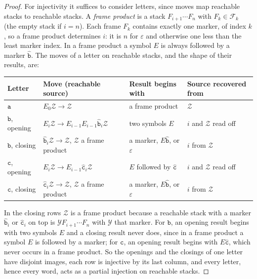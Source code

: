 \documentclass[11pt]{article}
\numberwithin{equation}{section}
\theoremstyle{plain}
\theoremstyle{definition}
\theoremstyle{remark}
\newcommand{\eps}{\varepsilon}
\theoremstyle{plain}
\begin{document}
\begin{proof}
For injectivity it suffices to consider letters, since moves map reachable
stacks to reachable stacks.  A \emph{frame product} is a stack
$F_{i+1}\cdots F_n$ with $F_k\in\mathcal F_k$ (the empty stack if $i=n$).  Each
frame $F_k$ contains exactly one marker, of index $k$, so a frame product
determines $i$: it is $n$ for $\eps$ and otherwise one less than the least
marker index.  In a frame product a symbol $E$ is always followed by a marker
$\hat{\mathtt b}$.  The moves of a letter on reachable stacks, and the shape of
their results, are:
\begin{center}
\footnotesize
\renewcommand{\arraystretch}{1.15}
\begin{tabular}{@{}llll@{}}
\hline
Letter & Move (reachable source) & Result begins with & Source recovered from\\
\hline
$\mathtt a$ & $E_0\mathcal Z\to\mathcal Z$ & a frame product & $\mathcal Z$\\
$\mathtt b$, opening & $E_i\mathcal Z\to E_{i-1}E_{i-1}\hat{\mathtt b}_i\mathcal Z$ & two symbols $E$ & $i$ and $\mathcal Z$ read off\\
$\mathtt b$, closing & $\hat{\mathtt b}_i\mathcal Z\to\mathcal Z$, $\mathcal Z$ a frame product & a marker, $E\hat{\mathtt b}$, or $\eps$ & $i$ from $\mathcal Z$\\
$\mathtt c$, opening & $E_i\mathcal Z\to E_{i-1}\hat{\mathtt c}_i\mathcal Z$ & $E$ followed by $\hat{\mathtt c}$ & $i$ and $\mathcal Z$ read off\\
$\mathtt c$, closing & $\hat{\mathtt c}_i\mathcal Z\to\mathcal Z$, $\mathcal Z$ a frame product & a marker, $E\hat{\mathtt b}$, or $\eps$ & $i$ from $\mathcal Z$\\
\hline
\end{tabular}
\end{center}
In the closing rows $\mathcal Z$ is a frame product because a reachable stack
with a marker $\hat{\mathtt b}_i$ or $\hat{\mathtt c}_i$ on top is $\mathcal YF_{i+1}\cdots
F_n$ with $\mathcal Y$ that marker.  For $\mathtt b$, an opening result begins with
two symbols $E$ and a closing result never does, since in a frame product a
symbol $E$ is followed by a marker; for $\mathtt c$, an opening result begins with
$E\hat{\mathtt c}$, which never occurs in a frame product.  So the openings and the
closings of one letter have disjoint images, each row is injective by its last
column, and every letter, hence every word, acts as a partial injection on
reachable stacks.
\end{proof}
\end{document}
